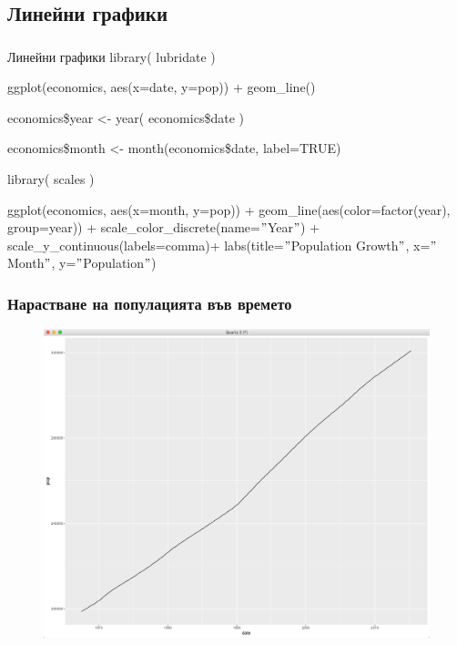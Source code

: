 \documentclass{beamer}
\begin{document}
\subsection{Линейни графики}

\begin{frame}
\frametitle{}
\begin{block}{Линейни графики}
library( lubridate )

ggplot(economics, aes(x=date, y=pop)) + geom\_line()

economics\$year <- year( economics\$date )

economics\$month <- month(economics\$date, label=TRUE)

library( scales )

ggplot(economics, aes(x=month, y=pop)) + geom\_line(aes(color=factor(year), group=year)) + scale\_color\_discrete(name=$"$Year$"$) + scale\_y\_continuous(labels=comma)+ labs(title=$"$Population Growth$"$, x=$"$Month$"$, y=$"$Population$"$)
\end{block}
\end{frame}

\begin{frame}
\frametitle{Нарастване на популацията във времето}
\begin{figure}[]\includegraphics[width=\textwidth,height=0.75\textheight]{pic0041}\end{figure}
\end{frame}
\end{document}
